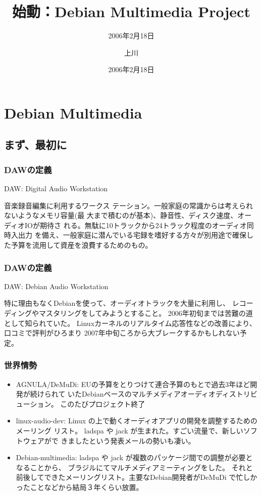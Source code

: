 \documentclass[cjk,dvipdfmx]{beamer}
\title[Debian 勉強会]{始動：Debian Multimedia Project}
\subtitle{2006年2月18日}
\author{上川}
\date{2006年2月18日}
\begin{document}
\frame{\titlepage{}}
 
 \section{Debian Multimedia}
 \subsection{まず、最初に}
 \begin{frame}
  \frametitle{DAWの定義}
   DAW: Digital Audio Workstation

   音楽録音編集に利用するワークス
	 テーション。一般家庭の常識からは考えられないようなメモリ容量(最
	 大まで積むのが基本)、静音性、ディスク速度、オーディオIOが期待さ
	 れる。無駄に10トラックから24トラック程度のオーディオ同時入出力
	 を備え、一般家庭に潜んでいる宅録を嗜好する方々が別用途で確保し
	 た予算を流用して資産を浪費するためのもの。
 \end{frame}
 
 \begin{frame}
  \frametitle{DAWの定義}
  DAW: Debian Audio Workstation

  
	 特に理由もなくDebianを使って、オーディオトラックを大量に利用し、
	 レコーディングやマスタリングをしてみようとすること。
	 2006年初旬までは苦難の道として知られていた。
	 Linuxカーネルのリアルタイム応答性などの改善により、
	 口コミで評判がひろまり
	 2007年中旬ころから大ブレークするかもしれない予定。
 \end{frame}


\begin{frame}
\frametitle{世界情勢}
 \begin{itemize}
  \item AGNULA/DeMuDi:
	EUの予算をとりつけて連合予算のもとで過去3年ほど開発が続けられて
	いたDebianベースのマルチメディアオーディオディストリビューション。
	このたびプロジェクト終了
  \item linux-audio-dev: 
	Linux の上で動くオーディオアプリの開発を調整するためのメーリング
	リスト。
	ladspa や jack が生まれた。すごい流量で、新しいソフトウェアがで
	きましたという発表メールの勢いも凄い。
  \item Debian-multimedia:
	ladspa や jack が複数のパッケージ間での調整が必要となることから、
	ブラジルにてマルチメディアミーティングをした。
	それと前後してできたメーリングリスト。主要なDebian開発者がDeMuDi
	で忙しかったことなどから結局３年くらい放置。
 \end{itemize}
\end{frame}
\end{document}

